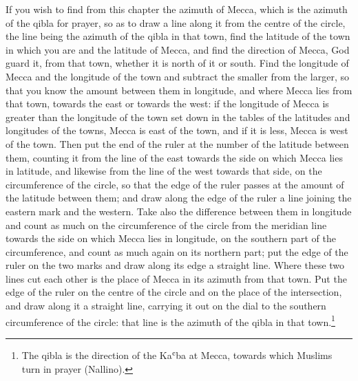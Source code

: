 \documentclass[11pt]{article}
\begin{document}
\par If you wish to find from this chapter the azimuth of Mecca, which is the azimuth of the qibla for prayer, so as to draw a line along it from the centre of the circle, the line being the azimuth of the qibla in that town, find the latitude of the town in which you are and the latitude of Mecca, and find the direction of Mecca, God guard it, from that town, whether it is north of it or south. Find the longitude of Mecca and the longitude of the town and subtract the smaller from the larger, so that you know the amount between them in longitude, and where Mecca lies from that town, towards the east or towards the west: if the longitude of Mecca is greater than the longitude of the town set down in the tables of the latitudes and longitudes of the towns, Mecca is east of the town, and if it is less, Mecca is west of the town. Then put the end of the ruler at the number of the latitude between them, counting it from the line of the east towards the side on which Mecca lies in latitude, and likewise from the line of the west towards that side, on the circumference of the circle, so that the edge of the ruler passes at the amount of the latitude between them; and draw along the edge of the ruler a line joining the eastern mark and the western. Take also the difference between them in longitude and count as much on the circumference of the circle from the meridian line towards the side on which Mecca lies in longitude, on the southern part of the circumference, and count as much again on its northern part; put the edge of the ruler on the two marks and draw along its edge a straight line. Where these two lines cut each other is the place of Mecca in its azimuth from that town. Put the edge of the ruler on the centre of the circle and on the place of the intersection, and draw along it a straight line, carrying it out on the dial to the southern circumference of the circle: that line is the azimuth of the qibla in that town.\footnote{The qibla is the direction of the Kaʿba at Mecca, towards which Muslims turn in prayer (Nallino).}\par
\end{document}
